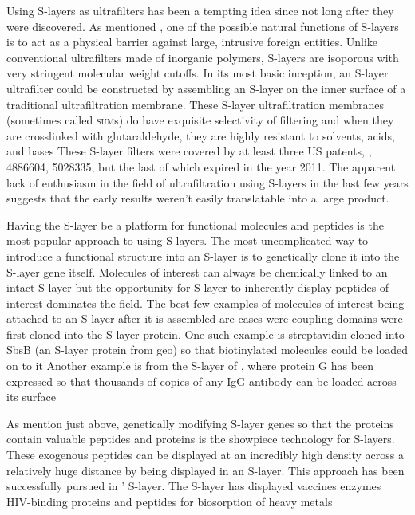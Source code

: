  Using \acp{S-layer} as ultrafilters has been a tempting idea since not long after they were discovered. As mentioned , one of the possible natural functions of \acp{S-layer} is to act as a physical barrier against large, intrusive foreign entities. Unlike conventional ultrafilters made of inorganic polymers, \acp{S-layer} are isoporous with very stringent molecular weight cutoffs. In its most basic inception, an \ac{S-layer} ultrafilter could be constructed by assembling an \ac{S-layer} on the inner surface of a traditional ultrafiltration membrane. These \ac{S-layer} ultrafiltration membranes (sometimes called \textsc{sum}s) do have exquisite selectivity of filtering and when they are crosslinked with glutaraldehyde, they are highly resistant to solvents, acids, and bases These \ac{S-layer} filters were covered by at least three US patents, , 4886604, 5028335, but the last of which expired in the year 2011. The apparent lack of enthusiasm in the field of ultrafiltration using \acp{S-layer} in the last few years suggests that the early results weren't easily translatable into a large product.
  
  Having the \ac{S-layer} be a platform for functional molecules and peptides is the most popular approach to using \acp{S-layer}. The most uncomplicated way to introduce a functional structure into an \ac{S-layer} is to genetically clone it into the \ac{S-layer} gene itself. Molecules of interest can always be chemically linked to an intact \ac{S-layer} but the opportunity for \ac{S-layer} to inherently display peptides of interest dominates the field. The best few examples of molecules of interest being attached to an \ac{S-layer} after it is assembled are cases were coupling domains were first cloned into the \ac{S-layer} protein. One such example is streptavidin cloned into SbsB (an \ac{S-layer} protein from \ac{geo}) so that biotinylated molecules could be loaded on to it Another example is from the \ac{S-layer} of \caulobacter{}, where protein G has been expressed so that thousands of copies of any IgG antibody can be loaded across its surface

  As mention just above, genetically modifying \ac{S-layer} genes so that the proteins contain valuable peptides and proteins is the showpiece technology for \acp{S-layer}. These exogenous peptides can be displayed at an incredibly high density across a relatively huge distance by being displayed in an \ac{S-layer}. This approach has been successfully pursued in \caulobacter{}' \ac{S-layer}. The \caulobacter{} \ac{S-layer} has displayed vaccines enzymes HIV-binding proteins and peptides for biosorption of heavy metals 

